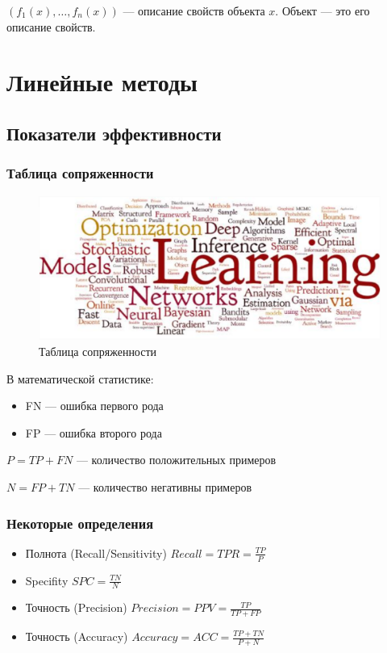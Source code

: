 \documentclass[10pt,a4paper,oneside,titlepage]{report}
\theoremstyle{defenition}
\theoremstyle{theorem}
\begin{document}
$(f_1(x), \ldots , f_n(x))$ --- описание свойств объекта $x$. Объект --- это его описание свойств.

\section{Линейные методы}

\subsection{Показатели эффективности}

\subsubsection{Таблица сопряженности}

\begin{figure}[h]
	\centering
	\includegraphics[width=0.7\linewidth]{pictures/screenshot001}
	\caption{Таблица сопряженности}
	\label{fig:screenshot001}
\end{figure}

В математической статистике:
\begin{itemize}
	\item FN --- ошибка первого рода
	\item FP --- ошибка второго рода
\end{itemize}

$P = TP + FN$ --- количество положительных примеров

$N = FP + TN$ --- количество негативны примеров

\subsubsection{Некоторые определения}

\begin{itemize}
	\item Полнота (Recall/Sensitivity) $Recall = TPR = \frac{TP}{P}$
	\item Specifity $SPC = \frac{TN}{N}$
	\item Точность (Precision) $Precision = PPV = \frac{TP}{TP + FP}$
	\item Точность (Accuracy) $Accuracy = ACC = \frac{TP + TN}{P + N}$
\end{itemize}
\end{document}
